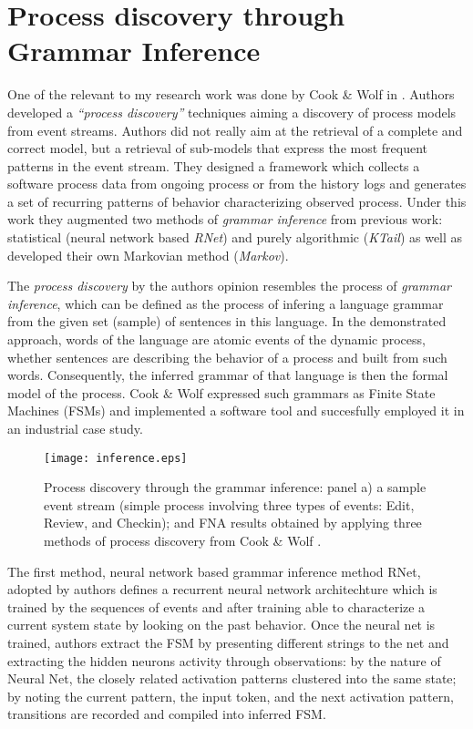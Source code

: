 \section{Process discovery through Grammar Inference} \label{grammar}
One of the relevant to my research work was done by Cook \& Wolf in \cite{citeulike:328044}. Authors developed a \textit{``process discovery''} techniques aiming a discovery of process models from event streams. Authors did not really aim at the retrieval of a complete and correct model, but a retrieval of sub-models that express the most frequent patterns in the event stream. They designed a framework which collects a software process data from ongoing process or from the history logs and generates a set of recurring patterns of behavior characterizing observed process. Under this work they augmented two methods of \textit{grammar inference} from previous work: statistical (neural network based \textit{RNet}) and purely algorithmic (\textit{KTail}) as well as developed their own Markovian method (\textit{Markov}). 

The \textit{process discovery} by the authors opinion resembles the process of \textit{grammar inference}, which can be defined as the process of infering a language grammar from the given set (sample) of sentences in this language. In the demonstrated approach, words of the language are atomic events of the dynamic process, whether sentences are describing the behavior of a process and built from such words. Consequently, the inferred grammar of that language is then the formal model of the process. Cook \& Wolf expressed such grammars as Finite State Machines (FSMs) and implemented a software tool and succesfully employed it in an industrial case study.

\begin{figure}[tbp]
   \centering
   \texttt{[image: inference.eps]}
   \caption{Process discovery through the grammar inference: panel a) a sample event stream (simple process involving three types of events: Edit, Review, and Checkin); and FNA results obtained by applying three methods of process discovery from Cook \& Wolf \cite{citeulike:328044}.}
   \label{fig:inference}
\end{figure}

The first method, neural network based grammar inference method RNet, adopted by authors defines a recurrent neural network architechture which is trained by the sequences of events and after training able to characterize a current system state by looking on the past behavior. Once the neural net is trained, authors extract the FSM by presenting different strings to the net and extracting the hidden neurons activity through observations: by the nature of Neural Net, the closely related activation patterns clustered into the same state; by noting the current pattern, the input token, and the next activation pattern, transitions are recorded and compiled into inferred FSM.

